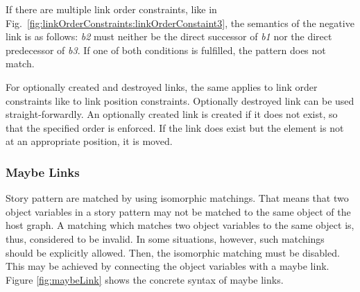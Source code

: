 {If there are multiple link order constraints, like in Fig.~\ref{fig:linkOrderConstraints:linkOrderConstaint3}, the semantics of the negative link is as follows: \emph{b2} must neither be the direct successor of \emph{b1} nor the direct predecessor of \emph{b3}. If one of both conditions is fulfilled, the pattern does not match.


For optionally created and destroyed links, the same applies to link order constraints like to link position constraints. Optionally destroyed link can be used straight-forwardly. An optionally created link is created if it does not exist, so that the specified order is enforced. If the link does exist but the element is not at an appropriate position, it is moved.

\subsubsection{Maybe Links}
\label{sec:StoryPatterns:specialLinks:maybeLink}

Story pattern are matched by using isomorphic matchings. That means that two object variables in a story pattern may not be matched to the same object of the host graph. A matching which matches two object variables to the same object is, thus, considered to be invalid. In some situations, however, such matchings should be explicitly allowed. Then, the isomorphic matching must be disabled. This may be achieved by connecting the object variables with a maybe link. Figure \ref{fig:maybeLink} shows the concrete syntax of maybe links. 

}
